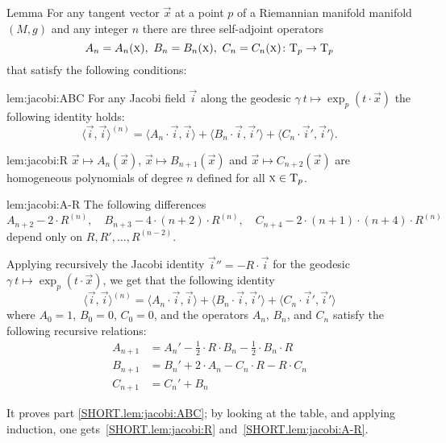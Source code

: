 \documentclass[a4paper,10pt]{article}
\begin{document}
\begin{thm}{Lemma}\label{lem:jacobi}
For any tangent vector $\vec{x}$ at a point $p$ of a Riemannian manifold manifold $(M,g)$ and any integer $n$ there are three self-adjoint operators 
\[A_n=A_n(\vec{x}),\ B_n=B_n(\vec{x}),\ C_n=C_n(\vec{x})\:\T_p\to \T_p\]
that satisfy the following conditions:

\begin{subthm}{lem:jacobi:ABC}
For any Jacobi field $\vec{i}$ along the geodesic $\gamma\:t\mapsto \exp_p(t\cdot \vec{x})$ the following identity holds:
\[\langle \vec{i},\vec{i}\rangle^{(n)}
=
\langle A_n\cdot \vec{i},\vec{i}\rangle+ \langle B_n\cdot \vec{i}, \vec{i}'\rangle+\langle C_n\cdot \vec{i}', \vec{i}'\rangle.\]
\end{subthm}

\begin{subthm}{lem:jacobi:R}
$\vec{x}\mapsto A_{n}(\vec{x})$, $\vec{x}\mapsto B_{n+1}(\vec{x})$ and $\vec{x}\mapsto C_{n+2}(\vec{x})$ are homogeneous polynomials of degree $n$ defined for all $\text{\sc{x}}\in \mathrm{T}_p$.
\end{subthm}

\begin{subthm}{lem:jacobi:A-R}
The following differences 
\[A_{n+2}-2\cdot R^{(n)},
\quad 
B_{n+3}-4\cdot(n+2)\cdot R^{(n)},
\quad
C_{n+4}-2\cdot(n+1)\cdot(n+4)\cdot R^{(n)}\]
depend only on $R,R',\dots, R^{(n-2)}$.
\end{subthm}


\end{thm}

Applying recursively the Jacobi identity $\vec{i}''=-R\cdot \vec{i}$ for the geodesic $\gamma\:t\mapsto\exp_p(t\cdot \vec{x})$, we get that the following identity 
\[\langle \vec{i},\vec{i}\rangle^{(n)}
=
\langle A_n\cdot \vec{i},\vec{i}\rangle+ \langle B_n\cdot \vec{i},\vec{i}'\rangle+\langle C_n\cdot \vec{i}',\vec{i}'\rangle\]
where $A_0=1$, $B_0=0$, $C_0=0$, and the operators $A_n$, $B_n$, and $C_n$ satisfy the following recursive relations:
\begin{align*}
A_{n+1}&=A_n'-\tfrac12\cdot R\cdot B_n-\tfrac12\cdot B_n\cdot R
\\
B_{n+1}&=B_n'+ 2\cdot A_n-C_n\cdot R-R\cdot C_n
\\
C_{n+1}&=C_n'+ B_n
\end{align*}

It proves part \ref{SHORT.lem:jacobi:ABC};
by looking at the table, and applying induction, one gets~\ref{SHORT.lem:jacobi:R} and~\ref{SHORT.lem:jacobi:A-R}.\qeds
\end{document}
